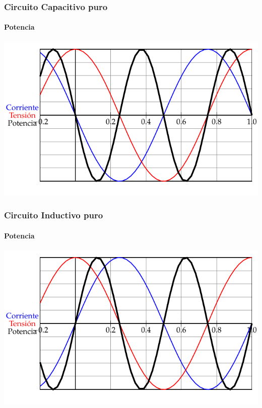 \documentclass[serif, xcolor=dvipsnames]{beamer}
\begin{document}
\begin{frame}[plain]
  \frametitle{Circuito Capacitivo puro}


  \framesubtitle{Potencia}

  \begin{center}
    \includegraphics{../figs/PlotCircuitoCapacitivoPuro_Potencia}
    \par\end{center}


\end{frame}
\begin{frame}[plain]
  \frametitle{Circuito Inductivo puro}


  \framesubtitle{Potencia}

  \begin{center}
    \includegraphics{../figs/PlotCircuitoInductivoPuro_Potencia}
    \par\end{center}


\end{frame}
\end{document}
